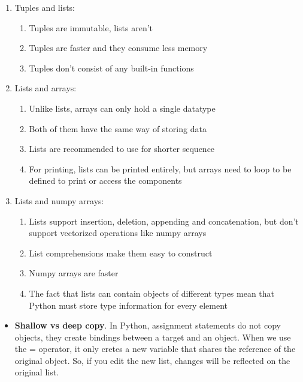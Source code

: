 \documentclass[
  letterpaper,
]{book}
\providecommand{\tightlist}{%
  \setlength{\itemsep}{0pt}\setlength{\parskip}{0pt}}\usepackage{longtable,booktabs,array}
\begin{document}
\begin{enumerate}
\def\labelenumi{\arabic{enumi})}
\tightlist
\item
  Tuples and lists:

  \begin{enumerate}
  \def\labelenumii{\alph{enumii})}
  \tightlist
  \item
    Tuples are immutable, lists aren't
  \item
    Tuples are faster and they consume less memory
  \item
    Tuples don't consist of any built-in functions
  \end{enumerate}
\item
  Lists and arrays:

  \begin{enumerate}
  \def\labelenumii{\alph{enumii})}
  \tightlist
  \item
    Unlike lists, arrays can only hold a single datatype
  \item
    Both of them have the same way of storing data
  \item
    Lists are recommended to use for shorter sequence
  \item
    For printing, lists can be printed entirely, but arrays need to loop
    to be defined to print or access the components
  \end{enumerate}
\item
  Lists and numpy arrays:

  \begin{enumerate}
  \def\labelenumii{\alph{enumii})}
  \tightlist
  \item
    Lists support insertion, deletion, appending and concatenation, but
    don't support vectorized operations like numpy arrays
  \item
    List comprehensions make them easy to construct
  \item
    Numpy arrays are faster
  \item
    The fact that lists can contain objects of different types mean that
    Python must store type information for every element
  \end{enumerate}
\end{enumerate}

\begin{itemize}
\tightlist
\item
  \textbf{Shallow vs deep copy}. In Python, assignment statements do not
  copy objects, they create bindings between a target and an object.
  When we use the = operator, it only cretes a new variable that shares
  the reference of the original object. So, if you edit the new list,
  changes will be reflected on the original list.
\end{itemize}
\end{document}
